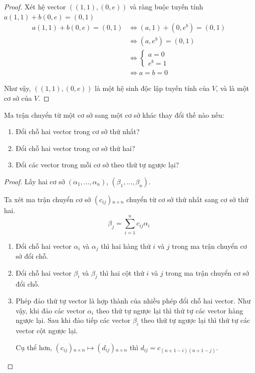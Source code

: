 \begin{proof}
    Xét hệ vector $((1, 1), (0, e))$ và ràng buộc tuyến tính $a(1, 1) + b(0, e) = (0, 1)$
    \begin{align*}
        a(1, 1) + b(0, e) = (0, 1) & \Longleftrightarrow (a, 1) + (0, e^{b}) = (0, 1) \\
        & \Longleftrightarrow (a, e^{b}) = (0, 1)          \\
        & \Longleftrightarrow
        \begin{cases}
            a = 0 \\
            e^{b} = 1
        \end{cases} \\
        & \Longleftrightarrow a = b = 0
    \end{align*}
    
    Như vậy, $((1, 1), (0, e))$ là một hệ sinh độc lập tuyến tính của $V$, và là một cơ sở của $V$.
\end{proof}

\begin{exercise}Ma trận chuyển từ một cơ sở sang một cơ sở khác thay đổi thế nào nếu:
    \begin{enumerate}[label = (\alph*),itemsep=0pt]
        \item Đổi chỗ hai vector trong cơ sở thứ nhất?
        \item Đổi chỗ hai vector trong cơ sở thứ hai?
        \item Đổi các vector trong mỗi cơ sở theo thứ tự ngược lại?
    \end{enumerate}
\end{exercise}

\begin{proof}
    Lấy hai cơ sở $(\alpha_{1},\ldots, \alpha_{n})$, $(\beta_{1},\ldots,\beta_{n})$.
    
    Ta xét ma trận chuyển cơ sở $(c_{ij}){}_{n\times n}$ chuyển từ cơ sở thứ nhất sang cơ sở thứ hai.
    \[
        \beta_{j} = \sum^{n}_{i=1}c_{ij}\alpha_{i}
    \]
    \begin{enumerate}[label = (\alph*),itemsep=0pt]
        \item Đổi chỗ hai vector $\alpha_{i}$ và $\alpha_{j}$ thì hai hàng thứ $i$ và $j$ trong ma trận chuyển cơ sở đổi chỗ.
        \item Đổi chỗ hai vector $\beta_{i}$ và $\beta_{j}$ thì hai cột thứ $i$ và $j$ trong ma trận chuyển cơ sở đổi chỗ.
        \item Phép đảo thứ tự vector là hợp thành của nhiều phép đổi chỗ hai vector. Như vậy, khi đảo các vector $\alpha_{i}$ theo thứ tự ngược lại thì thứ tự các vector hàng ngược lại. Sau khi đảo tiếp các vector $\beta_{i}$ theo thứ tự ngược lại thì thứ tự các vector cột ngược lại.
              
              Cụ thể hơn, $(c_{ij}){}_{n\times n} \mapsto (d_{ij}){}_{n\times n}$ thì $d_{ij} = c_{(n+1-i)(n+1-j)}$.
    \end{enumerate}
\end{proof}

